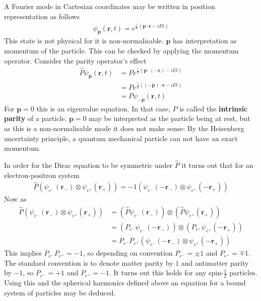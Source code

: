 A Fourier mode in Cartesian coordinates may be written in position representation as follows
\begin{align*}
\psi_\mathbf{p}(\mathbf{r},t) = e^{\frac{i}{\hbar}\left(\mathbf{p}\cdot\mathbf{r}-iE t\right)}
\end{align*}
This state is not physical for it is non-normalisable. $\mathbf{p}$ has interpretation as momentum of the particle. This can be checked by applying the momentum operator. Consider the parity operator's effect
\begin{align*}
\hat{P}\psi_\mathbf{p}(\mathbf{r},t) &= P e^{\frac{i}{\hbar}\left(\mathbf{p}\cdot(-\mathbf{r})-iE t\right)} \\
&= P e^{\frac{i}{\hbar}\left((-\mathbf{p})\cdot\mathbf{r}-iE t\right)} \\
&= P\psi_\mathbf{-p}(\mathbf{r},t)
\end{align*}
For $\mathbf{p}=0$ this is an eigenvalue equation. In that case, $P$ is called the \textbf{intrinsic parity} of a particle. $\mathbf{p}=0$ may be interpreted as the particle being at rest, but as this is a non-normalisable mode it does not make sense: By the Heisenberg uncertainty principle, a quantum mechanical particle can not have an exact momentum. 

In order for the Dirac equation to be symmetric under $\hat{P}$ it turns out that for an electron-positron system
\begin{align*}
\hat{P}(\psi_{e^-}(\mathbf{r}_-)\otimes\psi_{e^+}(\mathbf{r}_+))=-1(\psi_{e^-}(-\mathbf{r}_-)\otimes\psi_{e^+}(-\mathbf{r}_+))
\end{align*}
Now as 
\begin{align*}
\hat{P}(\psi_{e^-}(\mathbf{r}_-)\otimes\psi_{e^+}(\mathbf{r}_+)) &= (\hat{P}\psi_{e^-}(\mathbf{r}_-))\otimes (\hat{P}\psi_{e^+}(\mathbf{r}_+)) \\
&= (P_{e^-}\psi_{e^-}(-\mathbf{r}_-))\otimes (P_{e^+}\psi_{e^+}(-\mathbf{r}_+)) \\
&= P_{e^-}P_{e^+}(\psi_{e^-}(-\mathbf{r}_-)\otimes\psi_{e^+}(-\mathbf{r}_+))
\end{align*}
This implies $P_{e^-}P_{e^+}=-1$, so depending on convention $P_{e^-}=\pm 1$ and $P_{e^+}=\mp 1$. The standard convention is to denote matter parity by $1$ and antimatter parity by $-1$, so $P_{e^-}= +1$ and $P_{e^+}=- 1$. It turns out this holds for any spin-$\frac{1}{2}$ particles. Using this and the spherical harmonics defined above an equation for a bound system of particles may be deduced.

